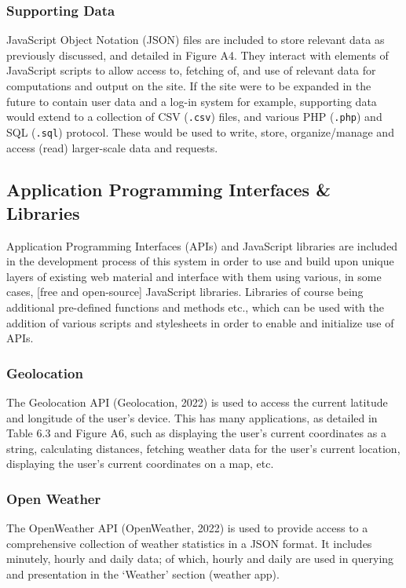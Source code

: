 \documentclass[11pt, english]{article}
\begin{document}
		\subsubsection{Supporting Data}

	JavaScript Object Notation (JSON) files are included to store relevant data as previously discussed, and detailed in Figure A4. They interact with elements of JavaScript scripts to allow access to, fetching of, and use of relevant data for computations and output on the site. If the site were to be expanded in the future to contain user data and a log-in system for example, supporting data would extend to a collection of CSV (\texttt{.csv}) files, and various PHP (\texttt{.php}) and SQL (\texttt{.sql}) protocol. These would be used to write, store, organize/manage and access (read) larger-scale data and requests.

	\subsection{Application Programming Interfaces \& Libraries}

	Application Programming Interfaces (APIs) and JavaScript libraries are included in the development process of this system in order to use and build upon unique layers of existing web material and interface with them using various, in some cases, [free and open-source] JavaScript libraries. Libraries of course being additional pre-defined functions and methods etc., which can be used with the addition of various scripts and stylesheets in order to enable and initialize use of APIs.

		\subsubsection{Geolocation}

	The Geolocation API (Geolocation, 2022) is used to access the current latitude and longitude of the user's device. This has many applications, as detailed in Table 6.3 and Figure A6, such as displaying the user's current coordinates as a string, calculating distances, fetching weather data for the user's current location, displaying the user's current coordinates on a map, etc.

		\subsubsection{Open Weather}

	The OpenWeather API (OpenWeather, 2022) is used to provide access to a comprehensive collection of weather statistics in a JSON format. It includes minutely, hourly and daily data; of which, hourly and daily are used in querying and presentation in the `Weather' section (weather app).
\end{document}

